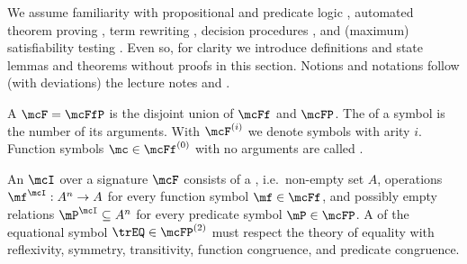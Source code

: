 %
We assume familiarity with propositional and predicate logic \cite{Huth:2004:LCS:975331},
automated theorem proving \cite{Fitting:1996:FLA:230183},
term rewriting \cite{Baader:1998:TR:280474},
decision procedures \cite{Kroening:2008:DPA:1391237},
and (maximum) satisfiability testing \cite{Biere:2009:HSV:1550723}.
Even so, for clarity we introduce
definitions and state lemmas and theorems without proofs in this section.
Notions and notations follow (with deviations) the lecture notes \cite{AM2015tr} and \cite{GM2013ar}.
\begin{definition}\label{def:signature}
A  $\mcF=\mcFfP$ is the disjoint union of  $\mcFf$
and  $\mcFP$.
The  of a symbol is the number of its arguments.
With $\mcF^{(i)}$ we denote symbols with arity $i$.
Function symbols $\mc\in\mcFf^{(0)}$ with no arguments are called .
\end{definition}
\begin{definition}
An  $\mcI$ over a signature $\mcF$ consists
of a , i.e.~non-empty set  $A$,
operations $\mf^\mcI: A^n\rightarrow A$  for every function symbol $\mf\in\mcFf$,
and possibly empty relations $\mP^\mcI\subseteq A^n$ for every predicate symbol $\mP\in\mcFP$.
A  of the equational symbol ${\trEQ}\in\mcFP^{(2)}$ must respect the theory of equality
with reflexivity, symmetry, transitivity, function congruence, and predicate congruence.
\end{definition}

